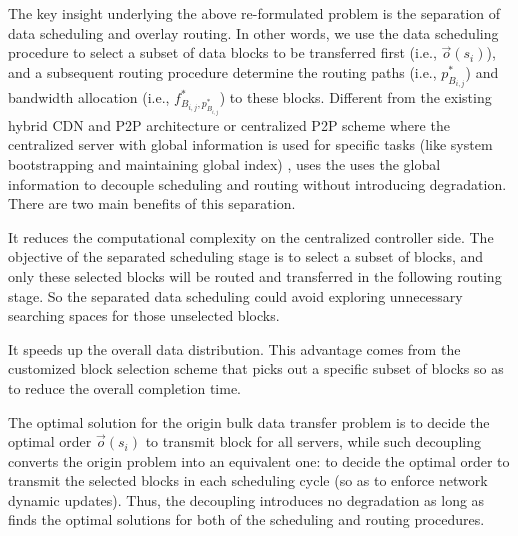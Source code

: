 The key insight underlying the above re-formulated problem is the
separation of data scheduling and overlay routing.
In other words, we use the data scheduling procedure to select a subset of data blocks to be transferred first
(i.e., $\overrightarrow{o}(s_i)$),
and a subsequent routing procedure determine the routing paths
(i.e., $p_{B_{i,j}}^*$)
and bandwidth allocation (i.e., $f^*_{B_{i,j},p_{B_{i,j}}^*}$) to these blocks.
Different from the existing hybrid CDN and P2P architecture \cite{yin2009design} or centralized P2P scheme \cite{lee2003centralized} where the centralized server with global information is used for specific tasks (like system bootstrapping and maintaining global index) \cite{androutsellis2004survey}, \name uses the uses the global information to decouple scheduling and routing without introducing degradation.
There are two main benefits of this separation.
\begin{packedenumerate}
\item It reduces the computational complexity on the centralized controller side. The objective of the separated scheduling stage is to select a subset of blocks, and only these selected blocks will be routed and transferred in the following routing stage. So the separated data scheduling could avoid exploring unnecessary searching spaces for those unselected blocks.
\item It speeds up the overall data distribution. This advantage comes from the customized block selection scheme that picks out a specific subset of blocks so as to reduce the overall completion time.
\end{packedenumerate}

The optimal solution for the origin bulk data transfer problem is to decide the optimal order $\overrightarrow{o}(s_i)$ to transmit block for all servers, while such decoupling converts the origin problem into an equivalent one: to decide the optimal order to transmit the selected blocks in each scheduling cycle (so as to enforce network dynamic updates). Thus, the decoupling introduces no degradation as long as \name finds the optimal solutions for both of the scheduling and routing procedures.

